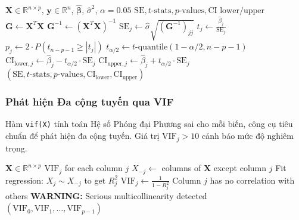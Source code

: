 \begin{algorithm}[H]
\caption{Coefficient Inference: Standard Errors, $t$-Statistics, $p$-Values, CI}
\begin{algorithmic}[1]
\Require $\mathbf{X} \in \mathbb{R}^{n \times p}$, $\mathbf{y} \in \mathbb{R}^n$, $\hat{\boldsymbol{\beta}}$, $\hat{\sigma}^2$, $\alpha = 0.05$
\Ensure $\text{SE}, t\text{-stats}, p\text{-values}, \text{CI lower/upper}$
\State $\mathbf{G} \gets \mathbf{X}^T\mathbf{X}$
\State $\mathbf{G}^{-1} \gets (\mathbf{X}^T\mathbf{X})^{-1}$ 
    \State $\text{SE}_j \gets \hat{\sigma}\sqrt{(\mathbf{G}^{-1})_{jj}}$ 
    \State $t_j \gets \frac{\hat{\beta}_j}{\text{SE}_j}$ 
    \State $p_j \gets 2 \cdot P(t_{n-p-1} \geq |t_j|)$ 
    \State $t_{\alpha/2} \gets t\text{-quantile}(1 - \alpha/2, n-p-1)$
    \State $\text{CI}_{\text{lower},j} \gets \hat{\beta}_j - t_{\alpha/2} \cdot \text{SE}_j$
    \State $\text{CI}_{\text{upper},j} \gets \hat{\beta}_j + t_{\alpha/2} \cdot \text{SE}_j$
\EndFor
\State \Return $(\text{SE}, t\text{-stats}, p\text{-values}, \text{CI}_{\text{lower}}, \text{CI}_{\text{upper}})$
\end{algorithmic}
\end{algorithm}

\subsubsection{Phát hiện Đa cộng tuyến qua VIF}

Hàm \texttt{vif(X)} tính toán Hệ số Phóng đại Phương sai cho mỗi biến, công cụ tiêu chuẩn để phát hiện đa cộng tuyến. Giá trị $\mathrm{VIF}_j > 10$ cảnh báo mức độ nghiêm trọng.

\begin{algorithm}[H]
\caption{Variance Inflation Factor (VIF)}
\begin{algorithmic}[1]
\Require $\mathbf{X} \in \mathbb{R}^{n \times p}$
\Ensure $\text{VIF}_j$ for each column $j$
    \State $X_{-j} \gets $ columns of $\mathbf{X}$ except column $j$
    \State Fit regression: $X_j \sim X_{-j}$ to get $R_j^2$
    \State $\text{VIF}_j \gets \frac{1}{1 - R_j^2}$ 
        \State Column $j$ has no correlation with others
        \State \textbf{WARNING:} Serious multicollinearity detected
    \EndIf
\EndFor
\State \Return $(\text{VIF}_0, \text{VIF}_1, \ldots, \text{VIF}_{p-1})$
\end{algorithmic}
\end{algorithm}

